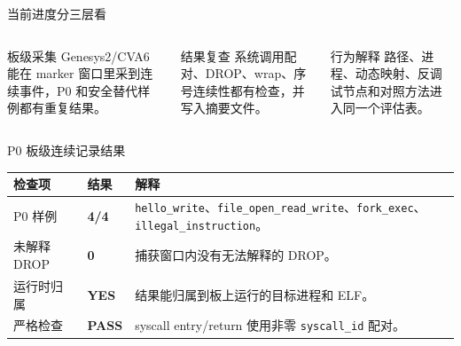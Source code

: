 \documentclass[aspectratio=169,10pt]{beamer}
\newcommand{\ok}[1]{\textcolor{rvgreen}{\textbf{#1}}}
\begin{document}
\begin{frame}{当前进度分三层看}
  \vskip0.1cm
  \begin{columns}[T,onlytextwidth]
    \begin{block}{板级采集}
      Genesys2/CVA6 能在 marker 窗口里采到连续事件，P0 和安全替代样例都有重复结果。
    \end{block}
    \begin{block}{结果复查}
      系统调用配对、DROP、wrap、序号连续性都有检查，并写入摘要文件。
    \end{block}
    \begin{block}{行为解释}
      路径、进程、动态映射、反调试节点和对照方法进入同一个评估表。
    \end{block}
  \end{columns}
  \vskip0.25cm
\end{frame}

\begin{frame}{P0 板级连续记录结果}
  \vskip0.05cm
  \begin{center}
  \renewcommand{\arraystretch}{1.20}
  \begin{tabularx}{0.92\linewidth}{@{}L{3.0cm}L{2.3cm}Y@{}}
    \toprule
    \textbf{检查项} & \textbf{结果} & \textbf{解释} \\
    \midrule
    P0 样例 & \ok{4/4} & \texttt{hello\_write}、\texttt{file\_open\_read\_write}、\texttt{fork\_exec}、\texttt{illegal\_instruction}。 \\
    未解释 DROP & \ok{0} & 捕获窗口内没有无法解释的 DROP。 \\
    运行时归属 & \ok{YES} & 结果能归属到板上运行的目标进程和 ELF。 \\
    严格检查 & \ok{PASS} & syscall entry/return 使用非零 \texttt{syscall\_id} 配对。 \\
    \bottomrule
  \end{tabularx}
  \end{center}
  \vskip0.12cm
\end{frame}
\end{document}
